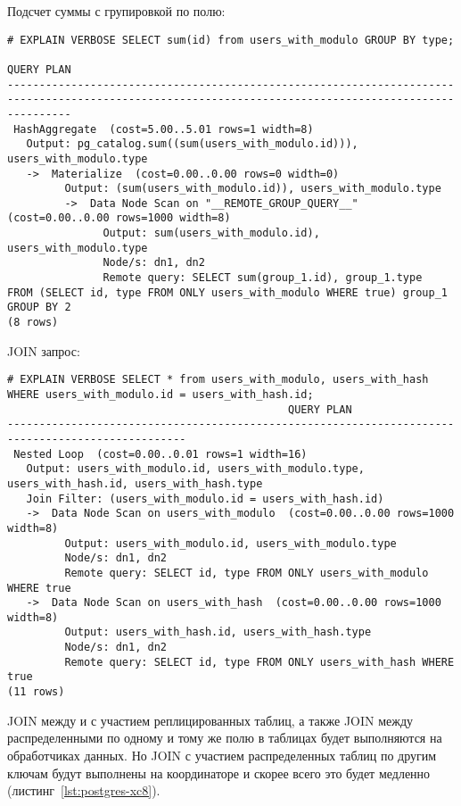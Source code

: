 Подсчет суммы с групировкой по полю:

\begin{lstlisting}[label=lst:postgres-xc7,caption=Выборка записей из распределенной таблицы]
# EXPLAIN VERBOSE SELECT sum(id) from users_with_modulo GROUP BY type;
                                                                      QUERY PLAN                                                                      
------------------------------------------------------------------------------------------------------------------------------------------------------
 HashAggregate  (cost=5.00..5.01 rows=1 width=8)
   Output: pg_catalog.sum((sum(users_with_modulo.id))), users_with_modulo.type
   ->  Materialize  (cost=0.00..0.00 rows=0 width=0)
         Output: (sum(users_with_modulo.id)), users_with_modulo.type
         ->  Data Node Scan on "__REMOTE_GROUP_QUERY__"  (cost=0.00..0.00 rows=1000 width=8)
               Output: sum(users_with_modulo.id), users_with_modulo.type
               Node/s: dn1, dn2
               Remote query: SELECT sum(group_1.id), group_1.type  FROM (SELECT id, type FROM ONLY users_with_modulo WHERE true) group_1 GROUP BY 2  
(8 rows)
\end{lstlisting}

JOIN запрос:

\begin{lstlisting}[label=lst:postgres-xc8,caption=Выборка записей из распределенной таблицы]
# EXPLAIN VERBOSE SELECT * from users_with_modulo, users_with_hash WHERE users_with_modulo.id = users_with_hash.id;
                                            QUERY PLAN                                            
--------------------------------------------------------------------------------------------------
 Nested Loop  (cost=0.00..0.01 rows=1 width=16)
   Output: users_with_modulo.id, users_with_modulo.type, users_with_hash.id, users_with_hash.type
   Join Filter: (users_with_modulo.id = users_with_hash.id)
   ->  Data Node Scan on users_with_modulo  (cost=0.00..0.00 rows=1000 width=8)
         Output: users_with_modulo.id, users_with_modulo.type
         Node/s: dn1, dn2
         Remote query: SELECT id, type FROM ONLY users_with_modulo WHERE true
   ->  Data Node Scan on users_with_hash  (cost=0.00..0.00 rows=1000 width=8)
         Output: users_with_hash.id, users_with_hash.type
         Node/s: dn1, dn2
         Remote query: SELECT id, type FROM ONLY users_with_hash WHERE true
(11 rows)
\end{lstlisting}

JOIN между и с участием реплицированных таблиц, а также JOIN между распределенными по одному и тому же полю в таблицах будет выполняются на обработчиках данных. Но JOIN с участием распределенных таблиц по другим ключам будут выполнены на координаторе и скорее всего это будет медленно (листинг~\ref{lst:postgres-xc8}).


